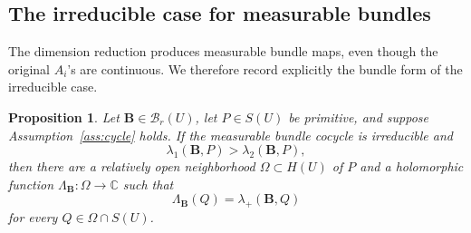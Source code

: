\documentclass[11pt,a4paper]{amsart}
\newtheorem{proposition}[theorem]{Proposition}
\begin{document}
\subsection{The irreducible case for measurable bundles}

The dimension reduction produces measurable bundle maps, even though
the original \(A_i\)'s are continuous.  We therefore record explicitly
the bundle form of the irreducible case.

\begin{proposition}
\label{prop:bundle-core}
Let \(\mathbf B\in\mathcal B_r(U)\), let \(P\in S(U)\) be primitive,
and suppose Assumption~\ref{ass:cycle} holds.  If the measurable bundle
cocycle is irreducible and
\[
 \lambda_1(\mathbf B,P)>\lambda_2(\mathbf B,P),
\]
then there are a relatively open neighborhood
\(\Omega\subset H(U)\) of \(P\) and a holomorphic function
\(\Lambda_{\mathbf B}:\Omega\to\mathbb C\) such that
\[
 \Lambda_{\mathbf B}(Q)=\lambda_+(\mathbf B,Q)
\]
for every \(Q\in\Omega\cap S(U)\).
\end{proposition}
\end{document}
